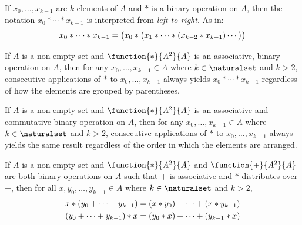 \begin{notation}[Infix]
     \label{notation:generalized-infix-notation}
    If \( x_{0}, \dots, x_{k-1} \) are \( k \) elements of \( A \) and \( \ast \) is a binary operation on \( A \),
    then the notation \( x_{0} \ast \cdots \ast x_{k-1} \) is interpreted from \emph{left to right}. As in:
    \begin{equation*}
        x_{0} \ast \cdots \ast x_{k-1} = \big( x_{0} \ast \big( x_{1} \ast \cdots \ast \mleft( x_{k-2} \ast x_{k-1} \mright) \cdots \big) \big)
    \end{equation*}
\end{notation}

\begin{thm}
     \label{thm:generalized-associative-law}
    If \( A \) is a non-empty set and \( \function{\ast}{A^{2}}{A} \) is an associative, binary operation on \( A \),
    then for any \( x_{0}, \dots, x_{k-1} \in A \) where \( k \in \naturalset \) and \( k > 2 \), consecutive applications
    of \( \ast \) to \( x_{0}, \dots, x_{k-1} \) always yields \( x_{0} \ast \cdots \ast x_{k-1} \) regardless of how the
    elements are grouped by parentheses.
\end{thm}

\begin{thm}
     \label{thm:generalized-commutative-law}
    If \( A \) is a non-empty set and \( \function{\ast}{A^{2}}{A} \) is an associative and commutative binary operation on \( A \),
    then for any \( x_{0}, \dots, x_{k-1} \in A \) where \( k \in \naturalset \) and \( k > 2 \), consecutive applications
    of \( \ast \) to \( x_{0}, \dots, x_{k-1} \) always yields the same result regardless of the order in which the elements are arranged.
\end{thm}

\begin{thm}
     \label{thm:generalized-distributive-law}
    If \( A \) is a non-empty set and \( \function{\ast}{A^{2}}{A} \) and \( \function{+}{A^{2}}{A} \) are both binary operations on \( A \)
    such that \( + \) is associative and \( \ast \) distributes over \( + \), then for all \( x,y_{0},\dots,y_{k-1} \in A \) where \( k \in \naturalset \)
    and \( k > 2\),
    \begin{align*}
        x \ast \mleft( y_{0} + \cdots + y_{k-1} \mright)
        &= \mleft( x \ast y_{0} \mright) + \cdots + \mleft( x \ast y_{k-1} \mright)\\
        \mleft( y_{0} + \cdots + y_{k-1} \mright) \ast x
        &= \mleft( y_{0} \ast x \mright) + \cdots + \mleft( y_{k-1} \ast x \mright)
    \end{align*}
    
\end{thm}

